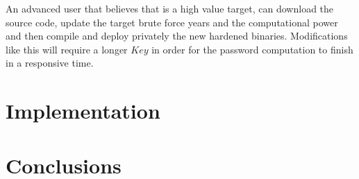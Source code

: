\documentclass{sig-alternate}
\begin{document}
An advanced user that believes that is a high value target, can download the source code,
update the target brute force years and the computational power and then compile
and deploy privately the new hardened \ours binaries. Modifications like this will require a longer
$Key$ in order for the password computation to finish in a responsive time.

\section{Implementation}\label{section:implementation}

\section{Conclusions}\label{section:conclusions}



\end{document}
